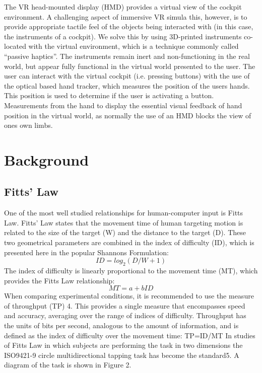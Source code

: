 \documentclass[]{aiaa-tc}%
\begin{document}
The VR head-mounted display (HMD) provides a virtual view of the cockpit environment.
A challenging aspect of immersive VR simula this, however, is to provide appropriate tactile feel of the objects being interacted with (in this case, the instruments of a cockpit).
We solve this by using 3D-printed instruments co-located with the virtual environment, which is a technique commonly called ``passive haptics''.
The instruments remain inert and non-functioning in the real world, but appear fully functional in the virtual world presented to the user.
The user can interact with the virtual cockpit (i.e. pressing buttons) with the use of the optical based hand tracker, which measures the position of the users hands.
This position is used to determine if the user is activating a button.
Measurements from the hand to display the essential visual feedback of hand position in the virtual world, as normally the use of an HMD blocks the view of ones own limbs.

\section{Background}
\subsection{Fitts' Law}
One of the most well studied relationships for human-computer input is Fitts Law\cite{fitts}.
Fitts' Law states that the movement time of human targeting motion is related to the size of the target (W) and the distance to the target (D).
These two geometrical parameters are combined in the index of difficulty (ID), which is presented here in the popular Shannons Formulation\cite{shannons}:
$$ID=log_2(D/W+1)$$
The index of difficulty is linearly proportional to the movement time (MT), which provides the Fitts Law relationship:
$$MT=a+bID$$
When comparing experimental conditions, it is recommended to use the measure of throughput (TP) 4.
This provides a single measure that encompasses speed and accuracy, averaging over the range of indices of difficulty.
Throughput has the units of bits per second, analogous to the amount of information, and is defined as the index of difficulty over the movement time:
TP=ID/MT
In studies of Fitts Law in which subjects are performing the task in two dimensions the ISO9421-9 circle multidirectional tapping task has become the standard5.
A diagram of the task is shown in Figure 2.
\end{document}
